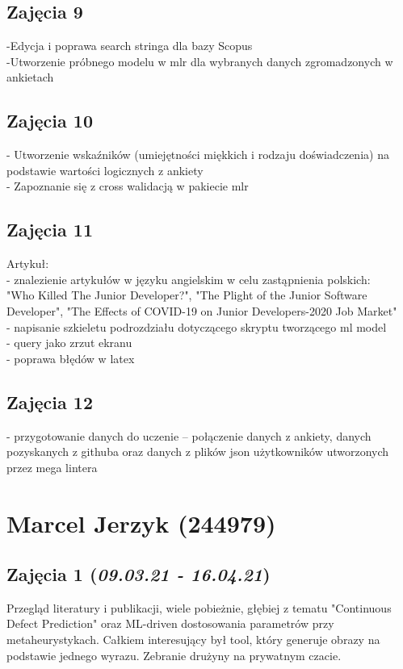 \documentclass[graybox]{svmult}
\begin{document}
\subsection{Zajęcia 9}
-Edycja i poprawa search stringa dla bazy Scopus\\
-Utworzenie próbnego modelu w mlr dla wybranych danych zgromadzonych w ankietach\\

\subsection{Zajęcia 10}
- Utworzenie wskaźników (umiejętności miękkich i rodzaju doświadczenia) na podstawie wartości logicznych z ankiety\\
- Zapoznanie się z cross walidacją w pakiecie mlr\\

\subsection{Zajęcia 11}
Artykuł:\\
- znalezienie artykułów w języku angielskim w celu zastąpnienia polskich:\\
"Who Killed The Junior Developer?", "The Plight of the Junior Software Developer", "The Effects of COVID-19 on Junior Developers-2020 Job Market"\\
- napisanie szkieletu podrozdziału dotyczącego skryptu tworzącego ml model\\
- query jako zrzut ekranu\\
- poprawa błędów w latex\\

\subsection{Zajęcia 12}
- przygotowanie danych do uczenie – połączenie danych z ankiety, danych pozyskanych z githuba oraz danych z plików json użytkowników utworzonych przez mega lintera


\newpage

\section{Marcel Jerzyk (244979)}
\subsection{Zajęcia 1 (\emph{09.03.21 - 16.04.21})}
Przegląd literatury i publikacji, wiele pobieżnie, głębiej z tematu "Continuous Defect Prediction" oraz ML-driven dostosowania parametrów przy metaheurystykach. Całkiem interesujący był tool, który generuje obrazy na podstawie jednego wyrazu. Zebranie drużyny na prywatnym czacie.
\end{document}

